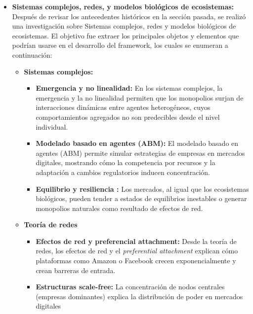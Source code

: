 \documentclass[a4paper,12pt]{article}
\begin{document}
\begin{itemize}
\begin{itemize}
\begin{itemize}
    \item \textbf{Monopolio colonial o comercial:} Implica la concesión de derechos exclusivos de comercio, usualmente por potencias coloniales, como ocurrió con las Compañías Británica y Holandesa de las Indias Orientales.
\end{itemize}
        \item \textbf{Sistemas complejos, redes, y modelos biológicos de ecosistemas:}
        Después de revisar los antecedentes históricos en la sección pasada, se realizó una investigación sobre Sistemas complejos, redes y modelos biológicos de ecosistemas. El objetivo fue extraer los principales objetos y elementos que podrían usarse en el desarrollo del framework, los cuales se enumeran a continuación:
        \begin{itemize}
        	\item \textbf{Sistemas complejos:}
			\begin{itemize}
		    \item \textbf{Emergencia y no linealidad:} En los sistemas complejos, la emergencia y la no linealidad permiten que los monopolios surjan de interacciones dinámicas entre agentes heterogéneos, cuyos comportamientos agregados no son predecibles desde el nivel individual.

    \item \textbf{Modelado basado en agentes (ABM):} El modelado basado en agentes (ABM) permite simular estrategias de empresas en mercados digitales, mostrando cómo la competencia por recursos y la adaptación a cambios regulatorios inducen concentración.

    \item \textbf{Equilibrio y resiliencia :} Los mercados, al igual que los ecosistemas biológicos, pueden tender a estados de equilibrios inestables o generar monopolios naturales como resultado de efectos de red.
			\end{itemize}
	\item \textbf{Teoría de redes}
		\begin{itemize}
    \item \textbf{Efectos de red y preferencial attachment:} Desde la teoría de redes, los efectos de red y el \textit{preferential attachment} explican cómo plataformas como Amazon o Facebook crecen exponencialmente y crean barreras de entrada.

    \item \textbf{Estructuras scale-free:} La concentración de nodos centrales (empresas dominantes) explica la distribución de poder en mercados digitales


\end{itemize}
\end{itemize}
\end{itemize}
\end{itemize}
\end{document}
